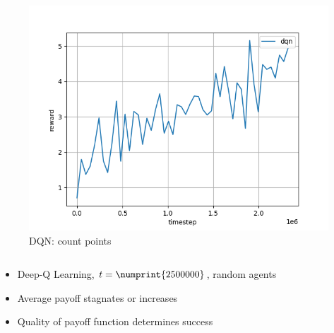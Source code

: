 \begin{frame}
\begin{columns}
\begin{column}[t]{.5\textwidth}
\begin{figure}
\includegraphics[width=\textwidth]{dqn-specific-payoff.png}
\caption{DQN: count points}
\end{figure}
\end{column}

\end{columns}

\begin{itemize}
\item Deep-Q Learning, $t = \numprint{2500000}$, random agents
\item Average payoff stagnates or increases
\item Quality of payoff function determines success
\end{itemize}
\end{frame}



